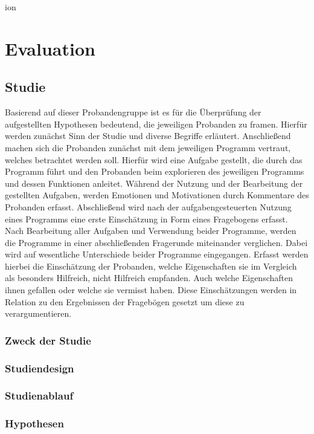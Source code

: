 
ion\chapter{Evaluation}
\label{ch:evaluation}

\section{Studie}

Basierend auf dieser Probandengruppe ist es für die Überprüfung der aufgestellten Hypothesen bedeutend, die jeweiligen Probanden zu framen. Hierfür werden zunächst Sinn der Studie und diverse Begriffe erläutert. Anschließend machen sich die Probanden zunächst mit dem jeweiligen Programm vertraut, welches betrachtet werden soll. Hierfür wird eine Aufgabe gestellt, die durch das Programm führt und den Probanden beim explorieren des jeweiligen Programms und dessen Funktionen anleitet. Während der Nutzung und der Bearbeitung der gestellten Aufgaben, werden Emotionen und Motivationen durch Kommentare des Probanden erfasst. Abschließend wird nach der aufgabengesteuerten Nutzung eines Programms eine erste Einschätzung in Form eines Fragebogens erfasst. Nach Bearbeitung aller Aufgaben und Verwendung beider Programme, werden die Programme in einer abschließenden Fragerunde miteinander verglichen. Dabei wird auf wesentliche Unterschiede beider Programme eingegangen. Erfasst werden hierbei die Einschätzung der Probanden, welche Eigenschaften sie im Vergleich als besonders Hilfreich, nicht Hilfreich empfanden. Auch welche Eigenschaften ihnen gefallen oder welche sie vermisst haben. Diese Einschätzungen werden in Relation zu den Ergebnissen der Fragebögen gesetzt um diese zu verargumentieren.

\subsection{Zweck der Studie}
\subsection{Studiendesign}
\subsection{Studienablauf}
\subsection{Hypothesen}

